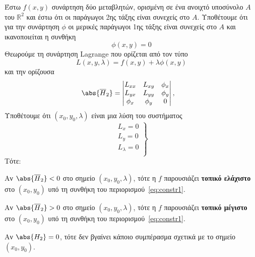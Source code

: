 \begin{thm}
  Έστω $ f(x,y) $ συνάρτηση δύο μεταβλητών, ορισμένη σε ένα ανοιχτό 
  υποσύνολο $A$ του $ \mathbb{R}^{2} $ και έστω ότι οι παράγωγοι 2ης τάξης είναι 
  συνεχείς στο $A$. Υποθέτουμε ότι για την συνάρτηση $ \phi $ οι μερικές παράγωγοι 
  1ης τάξης είναι συνεχείς στο $A$ και ικανοποιείται η συνθήκη 
  \begin{equation}
    \label{eq:constr1}
    \phi (x,y) = 0
  \end{equation}
  Θεωρούμε τη συνάρτηση Lagrange που ορίζεται από τον τύπο
  \[
    L(x,y, \lambda) = f(x,y) + \lambda \phi (x,y) 
  \] 
  και την ορίζουσα
  \[
    \abs{\overline{H}_{2}} = 
    \begin{vmatrix}
      L_{xx} & L_{xy} & \phi_{x} \\
      L_{yx} & L_{yy} & \phi_{y} \\
      \phi_{x} & \phi_{y} & 0
    \end{vmatrix}, \quad 
  \] 
  Υποθέτουμε ότι $ (x_{0}, y_{0}, \lambda) $ είναι μια λύση του συστήματος 
  \[
    \left.
      \begin{matrix}
        L_{x} = 0 \\
        L_{y} = 0 \\
        L_{\lambda} = 0 \\
      \end{matrix}
    \right\} 
  \]
  Τότε:
  \begin{myitemize}
    \item Αν $ \abs{\overline{H}_{2}} < 0 $ στο σημείο $ (x_{0}, y_{0}, \lambda) $, 
      τότε η $f$ παρουσιάζει \textbf{τοπικό ελάχιστο} στο $ (x_{0}, y_{0}) $ υπό τη
      συνθήκη του περιορισμού~\eqref{eq:constr1}.
    \item Αν $ \abs{\overline{H}_{2}} > 0 $ στο σημείο $ (x_{0}, y_{0}, \lambda) $, 
      τότε η $f$ παρουσιάζει \textbf{τοπικό μέγιστο} στο $ (x_{0}, y_{0}) $ υπό τη
      συνθήκη του περιορισμού~\eqref{eq:constr1}.
    \item Αν $ \abs{H_{2}} = 0 $, τότε δεν βγαίνει κάποιο συμπέρασμα σχετικά με το 
      σημείο $ (x_{0}, y_{0}) $.
  \end{myitemize}
\end{thm}

